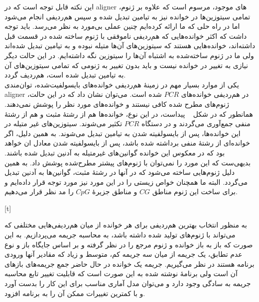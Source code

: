  این نکته قابل توجه است که در aligner های موجود، مرسوم است که علاوه بر ژنوم، تمامی سیتوزین‌ها در خوانده نیز به تیامین تبدیل شده و سپس هم‌ردیفی انجام می‌شود اما در راه حلی که ما ارائه کرده‌ایم چنین عملی بی‌مورد به نظر می‌رسد. باید توجه داشت که اکثر خوانده‌هایی که هم‌ردیفی ناموفقی با ژنوم ساخته شده در قسمت قبل داشته‌اند، خوانده‌هایی هستند که سیتوزین‌های آن‌ها متیله نبوده و به تیامین تبدیل شده‌اند ولی ما در ژنوم ساخته‌شده به اشتباه آن‌ها را سیتوزین نگه داشته‌ایم. در این حالت دیگر نیازی به تغییر در خوانده نیست و باید بدون تغییر به ژنومی که تمامی سیتوزین‌های آن به تیامین تبدیل شده است، هم‌ردیف گردد.
\\
یکی از موارد بسیار مهم در زمینهٔ هم‌ردیفی خوانده‌های بایسولفیت‌شده، توان‌مندی aligner در هم‌ردیفی خوانده‌های $PCR$ شده است. می‌توان نشان داد که در این حالت، ژنوم‌های مطرح شده کافی نیستند و خوانده‌های مورد نظر را پوشش نمی‌دهند. همانطور که در شکل ~ پیداست، در این نوع، خوانده‌ها هم از رشتهٔ مثبت و هم از رشتهٔ منفی جمع‌آوری می‌گردند و در دستگاه $PCR$ تکثیر می‌شوند. سیتوزین‌های غیر متیله در این خوانده‌ها، پس از بایسولفیته شدن به تیامین تبدیل می‌شوند. به همین دلیل، اگر خوانده‌ای از رشتهٔ منفی برداشته شده باشد، پس از بایسولفیته شدن معادل ان خواهد بود که در معکوس این خوانده گوانین‌های غیرمتیله به آدنین تبدیل شده باشند. بدیهی‌ست که این مورد را نمی‌توان با ژنوم‌های پیشتر مطرح‌شده پوشش داد. به همین دلیل ژنوم‌هایی ساخته می‌شود که در آنها در رشتهٔ مثبت، گوانین‌ها به آدنین تبدیل می‌گردد. البته ما همچنان خواص زیستی را در این مورد نیز مورد توجه قرار داده‌ایم و برای ساخت این ژنوم مناطق $CG$ و مناطق جزیرهٔ $CpG$ را مد نظر قرار می‌دهیم.


[t]




به منظور انتخاب بهترین هم‌ردیفی برای هر خوانده از میان هم‌ردیفی‌هایی مختلفی که می‌تواند با ژنوم‌های تولید شده داشته باشد، به محاسبه جریمه می‌پردازیم. به این صورت که باز به باز خوانده و ژنوم مرجع را در نظر گرفته و بر اساس جایگاه باز و نوع عدم تطابق، یک جریمه از میان سه جریمه کم، متوسط و زیاد که مقادیر آنها ورودی برنامه هستند در نظر می‌گیریم. جریمه یک خوانده در حال حاضر جمع جریمه‌های بازهای آن است ولی برنامهٔ نوشته شده به این صورت است که قابلیت تغییر تابع محاسبه جریمه به سادگی وجود دارد و می‌توان مدل آماری مناسب برای این کار را بدست آورد و با کمترین تغییرات ممکن آن را به برنامه افزود.



